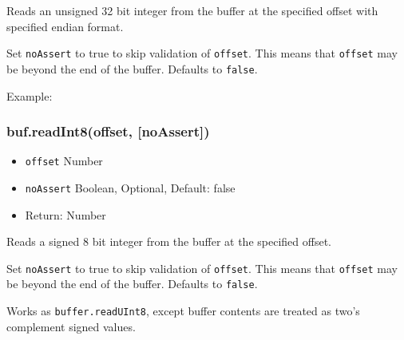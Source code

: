 Reads an unsigned 32 bit integer from the buffer at the specified offset
with specified endian format.

Set \texttt{noAssert} to true to skip validation of \texttt{offset}.
This means that \texttt{offset} may be beyond the end of the buffer.
Defaults to \texttt{false}.

Example:

\begin{Shaded}
\begin{Highlighting}[]
  \NormalTok{(}\NormalTok{);}

\NormalTok{buf[}\NormalTok{] = }\NormalTok{;}
\NormalTok{buf[}\NormalTok{] = }\NormalTok{;}
\NormalTok{buf[}\NormalTok{] = }\NormalTok{;}
\NormalTok{buf[}\NormalTok{] = }\NormalTok{;}

\NormalTok{(}\NormalTok{(}\NormalTok{));}
\NormalTok{(}\NormalTok{(}\NormalTok{));}

\end{Highlighting}
\end{Shaded}

\subsubsection{buf.readInt8(offset,
{[}noAssert{]})}\label{buf.readint8offset-noassert}

\begin{itemize}
\itemsep1pt\parskip0pt
\item
  \texttt{offset} Number
\item
  \texttt{noAssert} Boolean, Optional, Default: false
\item
  Return: Number
\end{itemize}

Reads a signed 8 bit integer from the buffer at the specified offset.

Set \texttt{noAssert} to true to skip validation of \texttt{offset}.
This means that \texttt{offset} may be beyond the end of the buffer.
Defaults to \texttt{false}.

Works as \texttt{buffer.readUInt8}, except buffer contents are treated
as two's complement signed values.

